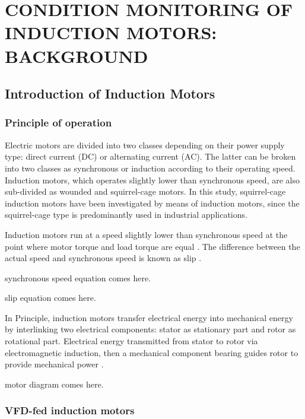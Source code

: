 \chapter{CONDITION MONITORING OF INDUCTION MOTORS: BACKGROUND }\label{Ch2}
\vspace*{-12pt} %
\section{Introduction of Induction Motors}
\subsection{Principle of operation}

Electric motors are divided into two classes depending on their power supply type: direct current (DC) or alternating current (AC). The latter can be broken into two classes as synchronous or induction according to their operating speed. Induction motors, which operates slightly lower than synchronous speed, are also sub-divided as wounded and squirrel-cage motors. In this study, squirrel-cage induction motors have been investigated by means of induction motors, since the squirrel-cage type is predominantly used in industrial applications. 

Induction motors run at a speed slightly lower than synchronous speed at the point where motor torque and load torque are equal \cite{gunnar2016}. The difference between the actual speed and synchronous speed is known as slip \cite{doe2008improving}.

synchronous speed equation comes here.

slip equation comes here.

In Principle, induction motors transfer electrical energy into mechanical energy by interlinking two electrical components: stator as stationary part and rotor as rotational part. Electrical energy transmitted from stator to rotor via electromagnetic induction, then a mechanical component bearing guides rotor to provide mechanical power \cite{oliver1992electric,karmakar2016induction}.

motor diagram comes here.

\subsection{VFD-fed induction motors}

